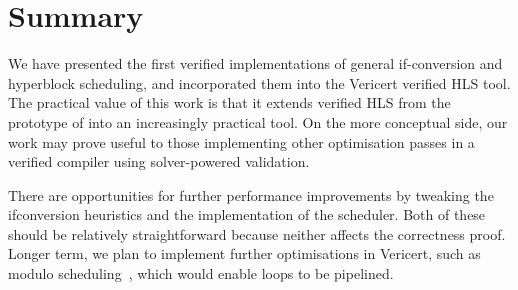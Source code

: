 {\section{Summary}

We have presented the first verified implementations of general if-conversion
and hyperblock scheduling, and incorporated them into the Vericert verified HLS
tool. The practical value of this work is that it extends verified HLS from the
prototype of \textcite{herklotz21_fvhls} into an
increasingly practical tool. On the more conceptual side, our work may prove
useful to those implementing other optimisation passes in a verified compiler
using solver-powered validation.

There are opportunities for further performance improvements by tweaking the
if\?conversion heuristics and the implementation of the scheduler. Both of these
should be relatively straightforward because neither affects the correctness
proof. Longer term, we plan to implement further optimisations in Vericert, such
as modulo scheduling~\cite{zhang13_sdc}, which would enable loops to be
pipelined.



}
